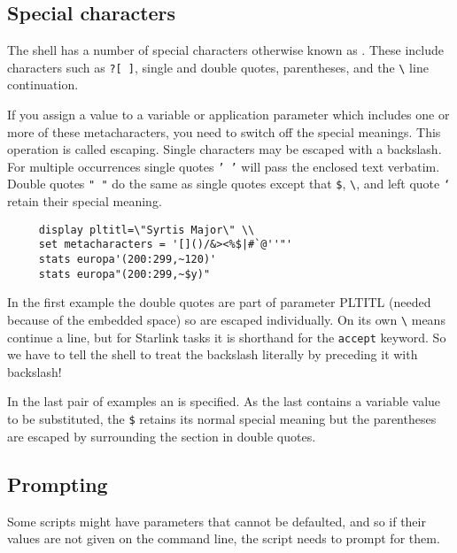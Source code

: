 \subsection{Special characters
\label{sc4_se_spec_char}}

The shell has a number of special characters otherwise known as
.  These include
 characters such as {\tt *?[~]},
single and double quotes, parentheses, and the \verb+\+ line
continuation.

If you assign a value to a variable or application parameter which
includes one or more of these metacharacters, you need to switch off
the special meanings.  This operation is called escaping.
Single characters may be escaped with a backslash.  For multiple
occurrences single quotes {\tt '~'} will pass the enclosed text
verbatim.  Double quotes {\tt "~"} do the same as single quotes except
that {\tt \$}, \verb+\+, and left quote {\tt `} retain their special
meaning.  

\small
\begin{verbatim}
     display pltitl=\"Syrtis Major\" \\
     set metacharacters = '[]()/&><%$|#`@''"'
     stats europa'(200:299,~120)'
     stats europa"(200:299,~$y)"
\end{verbatim}
\normalsize
In the first example the double quotes are part of parameter PLTITL
(needed because of the embedded space) so are escaped individually.  On
its own \verb+\+ means continue a line, but for Starlink tasks it is
shorthand for the {\tt accept} keyword.  So we have to tell the shell to
treat the backslash literally by preceding it with backslash!  

In the last pair of examples an 
is specified.  As the last contains a variable value to be
substituted, the {\tt \$} retains its normal special meaning but the
parentheses are escaped by surrounding the section in double quotes.

\newpage
\subsection{Prompting\label{sc4_se_prompting}}

Some scripts might have parameters that cannot be defaulted, and so
if their values are not given on the command line, the script
needs to prompt for them.

